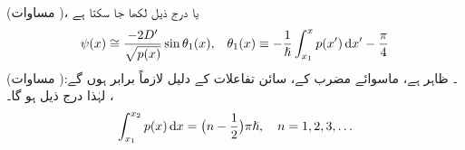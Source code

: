 (مساوات  )،   یا درج ذیل لکھا جا سکتا ہے
\begin{align*}
	\psi(x)\cong\frac{-2D'}{\sqrt{p(x)}} \sin\theta_{1}(x),&&\theta_{1}(x)\equiv -\frac{1}{\hslash}\int^{x}_{x_{1}} p(x')\dif x'-\frac{\pi}{4}
\end{align*}
(مساوات )۔ ظاہر ہے، ماسوائے مضرب   کے،      سائن تفاعلات کے دلیل لازماً برابر ہوں گے:   ،   لہٰذا درج ذیل ہو گا۔
\begin{align}\label{مساوات_وقب_کوانٹازنی_شرط_ڈھلوان_اطراف}
	\int^{x_{2}}_{x_{1}}p(x)\dif x=\big(n-\frac{1}{2}\big)\pi\hslash,\quad n=1,2,3,\dotsc
\end{align}

